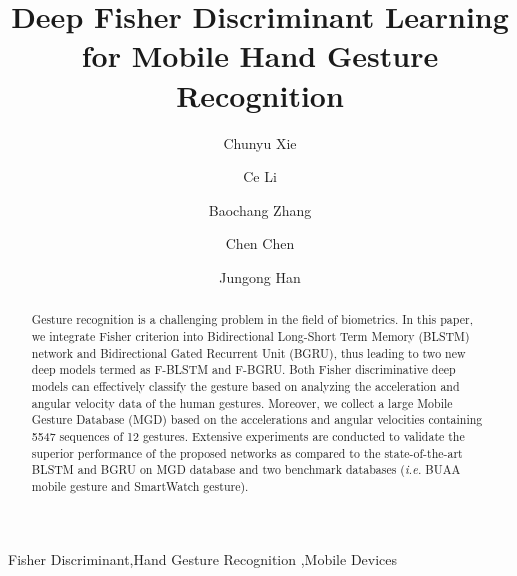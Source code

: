 \documentclass[review]{elsarticle}
\begin{document}
\begin{frontmatter}
\title{Deep Fisher Discriminant Learning for Mobile Hand Gesture Recognition}


\author[mymainaddress]{Chunyu Xie}

\author[mysecondaryaddress]{Ce Li}


\author[mymainaddress]{Baochang Zhang}

\author[mythirdaddress]{Chen Chen}
\author[myfourthaddress]{Jungong Han}

\address[mymainaddress]{Department of Automation, Beihang University, Beijing, China}
\address[mysecondaryaddress]{Department of Computer Science, China University of Mining and Technology, Beijing, China}
\address[mythirdaddress]{University of Central Florida, Orlando, FL, USA.}
\address[myfourthaddress]{Nortumbria Univesity, Newcastle, UK.}

\begin{abstract}
Gesture recognition is a challenging problem in the field of biometrics. In this paper, we integrate Fisher criterion into Bidirectional Long-Short Term Memory (BLSTM) network and Bidirectional Gated Recurrent Unit (BGRU), thus leading to two new deep models termed as F-BLSTM and F-BGRU. Both Fisher discriminative deep models can effectively classify the gesture based on analyzing the acceleration and angular velocity data of the human gestures. Moreover, we collect a large Mobile Gesture Database (MGD) based on the accelerations and angular velocities containing 5547 sequences of 12 gestures. Extensive experiments are conducted to validate the superior performance of the proposed networks as compared to the state-of-the-art BLSTM and BGRU on MGD database and two benchmark databases (\emph{i.e.} BUAA mobile gesture and SmartWatch gesture).
\end{abstract}

\begin{keyword}
Fisher Discriminant\sep Hand Gesture Recognition \sep Mobile Devices
\end{keyword}

\end{frontmatter}
\end{document}
